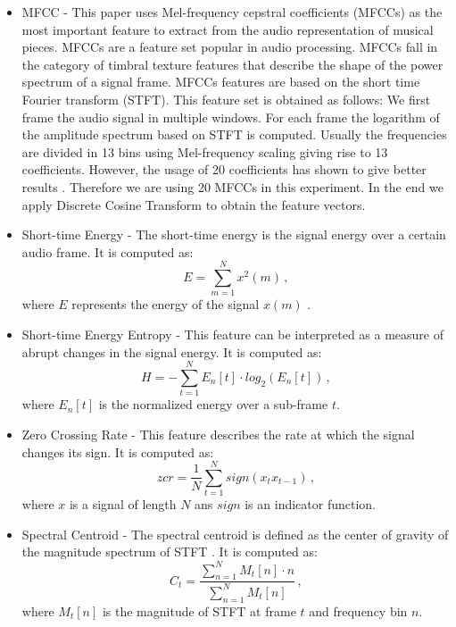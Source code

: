 \documentclass[a4paper,11pt,oneside]{article}
\begin{document}
\begin{itemize}
  \item MFCC - 
  This paper uses Mel-frequency cepstral coefficients (MFCCs) as the most important feature to extract from the audio representation 
  of musical pieces. MFCCs are a feature set popular in audio processing. MFCCs fall in the category of timbral 
  texture features that describe the shape of the power spectrum of a signal frame. MFCCs features are based on the 
  short time Fourier transform (STFT). This feature set is obtained as follows: We first frame the audio signal in 
  multiple windows. For each frame the logarithm of the amplitude spectrum based on STFT is computed. Usually the 
  frequencies are divided in 13 bins using Mel-frequency scaling giving rise to 13 coefficients. 
  However, the usage of 20 coefficients has shown to give better results \cite{ellis}. Therefore we are using 20 
  MFCCs in this experiment. In the end we apply Discrete Cosine Transform to obtain the feature vectors. 
  \item Short-time Energy - The short-time energy is the signal energy over a certain audio frame. It is computed as:
  \begin{equation} 
    E = \sum_{m=1}^{N} x^2(m)\,,
  \end{equation} where $E$ represents the energy of the signal $x(m)$ \cite{jalil2013short}.
  \item Short-time Energy Entropy - This feature can be interpreted as a measure of abrupt changes in the signal energy.
  It is computed as:
  \begin{equation}
    H = - \sum_{t=1}^N E_n[t]\cdot log_2(E_n[t])\,,
  \end{equation} where $E_n[t]$ is the normalized energy over a sub-frame $t$.
  \item Zero Crossing Rate - This feature describes the rate at which the signal changes its sign. It is computed as:
  \begin{equation}
    zcr = \frac{1}{N}\sum_{t=1}^{N} sign(x_t x_{t-1})\,,
  \end{equation} where $x$ is a signal of length $N$ ans $sign$ is an indicator function.
  \item Spectral Centroid - The spectral centroid is defined as the center of gravity of the magnitude spectrum of
  STFT \cite{tzan}. It is computed as:
  \begin{equation} \label{eq:3}
    C_t = \frac{\sum_{n=1}^N M_t[n]\cdot n}{\sum_{n=1}^N M_t[n]}\,,
  \end{equation} where $M_t[n]$ is the magnitude of STFT at frame $t$ and frequency bin $n$.

\end{itemize}
\end{document}
